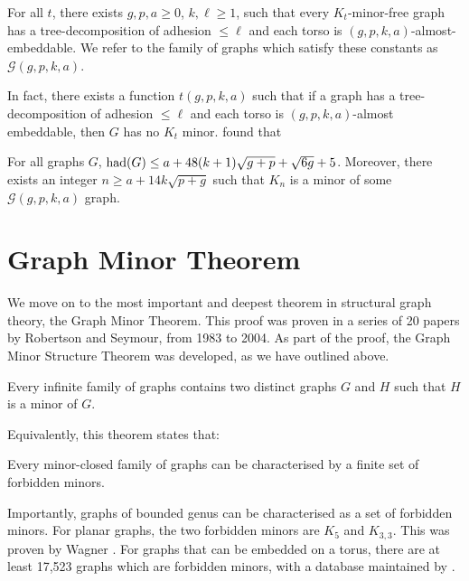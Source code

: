 \begin{theorem}
	For all \(t\), there exists \(g, p, a \geq 0\), \(k, \ell \geq 1\), such that every \(K_t\)-minor-free graph has a tree-decomposition of adhesion \(\leq \ell\) and each torso is \((g, p, k, a)\)-almost-embeddable. We refer to the family of graphs which satisfy these constants as \(\mathcal{G}(g, p, k, a)\). 
\end{theorem}
In fact, there exists a function \(t(g, p, k, a)\) such that if a graph has a tree-decomposition of adhesion \(\leq \ell\) and each torso is \((g, p, k, a)\)-almost embeddable, then \(G\) has no \(K_t\) minor. \textcite{joretCompleteGraphMinors2013} found that
\begin{theorem}\label{thm:graph_structure_bound_theorem}
	For all graphs \(G\),
	\(\operatorname{had}(G) \leq a + 48(k + 1)\sqrt{g + p} + \sqrt{6g} + 5\). Moreover, there exists an integer \(n \geq a + 1 4 k\sqrt{p + g}\) such that \(K_n\) is a minor of some \(\mathcal{G}(g, p, k, a)\) graph.
\end{theorem}

\section{Graph Minor Theorem}\label{sec:Graph Minor Theorem}
We move on to the most important and deepest theorem in structural graph theory, the Graph Minor Theorem. This proof was proven in a series of 20 papers by Robertson and Seymour, from 1983 to 2004. As part of the proof, the Graph Minor Structure Theorem was developed, as we have outlined above. 
\begin{theorem}
	Every infinite family of graphs contains two distinct graphs \(G\) and \(H\) such that \(H\) is a minor of \(G\).
\end{theorem}
Equivalently, this theorem states that:
\begin{theorem}
	Every minor-closed family of graphs can be characterised by a finite set of forbidden minors.
\end{theorem}
Importantly, graphs of bounded genus can be characterised as a set of forbidden minors.
For planar graphs, the two forbidden minors are \(K_5\) and \(K_{3,3}\). This was proven by Wagner \cite{wagnerUeberEigenschaftEbenen1937}. 
For graphs that can be embedded on a torus, there are at least 17,523 graphs which are forbidden minors, with a database maintained by \textcite{myrvoldLargeSetTorus2018}. 

